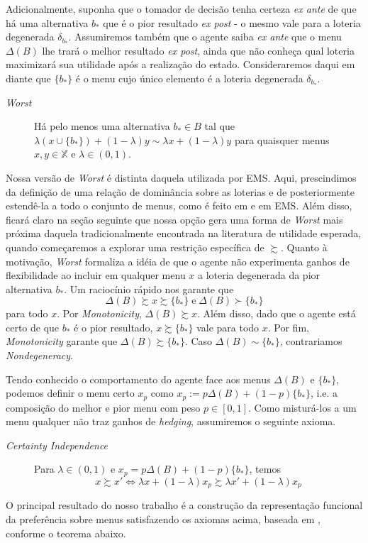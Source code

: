 \documentclass[12pt, a4paper]{article}
\theoremstyle{nonumberplain}
\theoremstyle{plain}
\theoremstyle{plain}
\theoremstyle{plain}
\theoremstyle{nonumberplain}
\begin{document}
Adicionalmente, suponha que o tomador de decisão tenha certeza \textit{ex ante} de que há uma alternativa $b_*$ que é o pior resultado \textit{ex post} - o mesmo vale para a loteria degenerada $\delta_{b_*}$. Assumiremos também que o agente saiba \textit{ex ante} que o menu $\Delta(B)$ lhe trará o melhor resultado \textit{ex post}, ainda que não conheça qual loteria maximizará sua utilidade após a realização do estado. Consideraremos daqui em diante que $\{b_*\}$ é o menu cujo único elemento é a loteria degenerada $\delta_{b_*}$.
\begin{description}
\item[\textit{Worst}] Há pelo menos uma alternativa $b_*\in B$ tal que $\lambda\left(x\cup \{b_*\}\right)+(1-\lambda)y\sim \lambda x + (1-\lambda)y$ para quaisquer menus $x,y\in \mathbb{X}$ e $\lambda\in (0,1)$.
\end{description}
Nossa versão de \emph{Worst} é distinta daquela utilizada por EMS. Aqui, prescindimos da definição de uma relação de dominância sobre as loterias e de posteriormente estendê-la a todo o conjunto de menus, como é feito em \cite{Kreps1979} e em EMS. Além disso, ficará claro na seção seguinte que nossa opção gera uma forma de \emph{Worst} mais próxima daquela tradicionalmente encontrada na literatura de utilidade esperada, quando começaremos a explorar uma restrição específica de $\succsim$. Quanto à motivação, \emph{Worst} formaliza a idéia de que o agente não experimenta ganhos de flexibilidade ao incluir em qualquer menu $x$ a loteria degenerada da pior alternativa $b_*$. Um raciocínio rápido nos garante que $$\Delta(B)\succsim x\succsim \{b_*\} \; \text{e} \; \Delta(B)\succ \{b_*\}$$ para todo $x$. Por \textit{Monotonicity}, $\Delta(B) \succsim x$. Além disso, dado que o agente está certo de que $b_*$ é o pior resultado, $x\succsim \{b_*\}$ vale para todo $x$. Por fim, \textit{Monotonicity} garante que $\Delta(B)\succsim \{b_*\}$. Caso $\Delta(B) \sim \{b_*\}$, contrariamos \textit{Nondegeneracy}.

Tendo conhecido o comportamento do agente face aos menus $\Delta(B)$ e $\{b_*\}$, podemos definir o menu certo $x_p$ como $x_p:=p\Delta(B)+(1-p)\{b_*\}$, i.e. a composição do melhor e pior menu com peso $p\in [0,1]$. Como misturá-los a um menu qualquer não traz ganhos de \emph{hedging}, assumiremos o seguinte axioma.

\begin{description}
\item [\textit{Certainty Independence}] Para $\lambda\in (0,1)$ e $x_p=p\Delta(B)+(1-p)\{b_*\}$, temos $$x\succsim x' \Leftrightarrow \lambda x +(1-\lambda)x_p\succsim \lambda x' + (1-\lambda)x_p$$
\end{description}
\noindent
O principal resultado do nosso trabalho é a construção da representação funcional da preferência sobre menus satisfazendo os axiomas acima, baseada em \cite{Epstein2007}, conforme o teorema abaixo.\\
\end{document}
